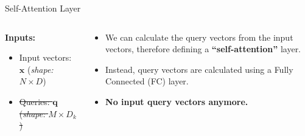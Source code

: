 \documentclass[serif, aspectratio=169]{beamer}
\begin{document}
\begin{frame}{Self-Attention Layer}
\begin{columns}
\begin{column}{0.44\textwidth}
				\textbf{Inputs:}
				\begin{itemize}
					\item Input vectors: $\mathbf{x}$ (\textit{shape: } $N \times D$)
					\item \st{Queries: $\mathbf{q}$ (\textit{shape: } $M \times D_k$)}
				\end{itemize}
			\end{column}
			
			\begin{column}{0.35\textwidth}
				\begin{itemize}
					\item We can calculate the query vectors from the input vectors, therefore defining a \textbf{“self-attention”} layer.
					\item Instead, query vectors are calculated using a Fully Connected (FC) layer.
					\item \textbf{No input query vectors anymore.}
				\end{itemize}
				
			\end{column}
		\end{columns}
\end{frame}
\end{document}
